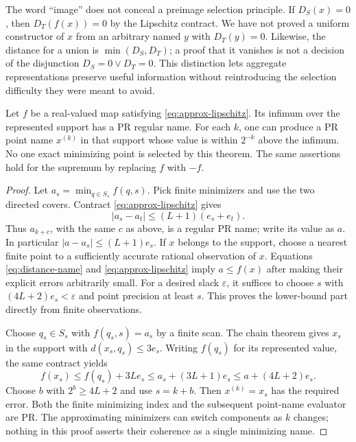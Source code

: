 The word ``image'' does not conceal a preimage selection principle.
If $D_S(x)=0$, then $D_T(f(x))=0$ by the Lipschitz contract.
We have not proved a uniform constructor of $x$ from an arbitrary named
$y$ with $D_T(y)=0$. Likewise, the distance for a union is
$\min(D_S,D_T)$; a proof that it vanishes is not a decision of the
disjunction $D_S=0\vee D_T=0$. This distinction lets aggregate
representations preserve useful information without reintroducing the
selection difficulty they were meant to avoid.

\begin{theorem}
\label{thm:aggregate-optimization}
Let $f$ be a real-valued map satisfying \eqref{eq:approx-lipschitz}.
Its infimum over the represented support has a PR regular name.
For each $k$, one can produce a PR point name $x^{(k)}$ in that support
whose value is within $2^{-k}$ above the infimum. No one exact minimizing
point is selected by this theorem. The same assertions hold for the
supremum by replacing $f$ with $-f$.
\end{theorem}

\begin{proof}
Let $a_s=\min_{q\in S_s}f(q,s)$. Pick finite minimizers and use the
two directed covers. Contract \eqref{eq:approx-lipschitz} gives
\[
                         |a_s-a_t|\le(L+1)(e_s+e_t).
\]
Thus $a_{k+c}$, with the same $c$ as above, is a regular PR name;
write its value as $a$. In particular $|a-a_s|\le(L+1)e_s$.
If $x$ belongs to the support, choose a nearest finite point to a
sufficiently accurate rational observation of $x$. Equations
\eqref{eq:distance-name} and \eqref{eq:approx-lipschitz} imply
$a\le f(x)$ after making their explicit errors arbitrarily small.
For a desired slack $\varepsilon$, it suffices to choose $s$ with
$(4L+2)e_s<\varepsilon$ and point precision at least $s$.
This proves the lower-bound part directly from finite observations.

Choose $q_s\in S_s$ with $f(q_s,s)=a_s$ by a finite scan. The chain
theorem gives $x_s$ in the support with $d(x_s,q_s)\le3e_s$.
Writing $f(q_s)$ for its represented value, the same contract yields
\[
 f(x_s)\le f(q_s)+3Le_s
          \le a_s+(3L+1)e_s
          \le a+(4L+2)e_s.
\]
Choose $b$ with $2^b\ge4L+2$ and use $s=k+b$. Then $x^{(k)}=x_s$
has the required error. Both the finite minimizing index and the
subsequent point-name evaluator are PR. The approximating minimizers can
switch components as $k$ changes; nothing in this proof asserts their
coherence as a single minimizing name.
\end{proof}

